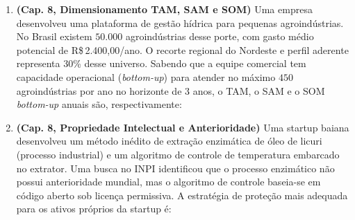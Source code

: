 \begin{enumerate}[leftmargin=1.5em, itemsep=8pt]
  \item \textbf{(Cap. 8, Dimensionamento TAM, SAM e SOM)} Uma empresa desenvolveu uma plataforma de gestão hídrica para pequenas agroindústrias. No Brasil existem $50.000$ agroindústrias desse porte, com gasto médio potencial de R\$\,2.400,00/ano. O recorte regional do Nordeste e perfil aderente representa 30\% desse universo. Sabendo que a equipe comercial tem capacidade operacional (\textit{bottom-up}) para atender no máximo $450$ agroindústrias por ano no horizonte de 3 anos, o TAM, o SAM e o SOM \textit{bottom-up} anuais são, respectivamente:
  \espacoResolucao[1.5cm]

  \item \textbf{(Cap. 8, Propriedade Intelectual e Anterioridade)} Uma startup baiana desenvolveu um método inédito de extração enzimática de óleo de licuri (processo industrial) e um algoritmo de controle de temperatura embarcado no extrator. Uma busca no INPI identificou que o processo enzimático não possui anterioridade mundial, mas o algoritmo de controle baseia-se em código aberto sob licença permissiva. A estratégia de proteção mais adequada para os ativos próprios da startup é:
  \espacoResolucao[1.2cm]


\end{enumerate}
